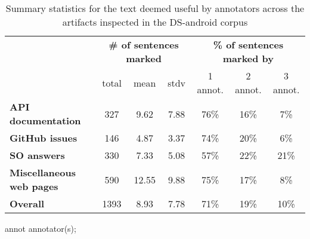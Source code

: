\begin{table}[H]
\centering    
\caption{Summary statistics for the text deemed useful by annotators across the artifacts inspected in the \acs{DS-android} corpus}
\label{tbl:corpus-annotation-summary}
\begin{footnotesize}
\begin{threeparttable}
\begin{tabular}{lcccccc}





& \multicolumn{3}{c}{\textbf{\# of sentences marked}}
& \multicolumn{3}{c}{\textbf{\% of sentences marked by}}
\\ \cmidrule(l){2-4} \cmidrule(l){5-7} 
& total & mean & stdv 
& 1 annot. & 2 annot. & 3 annot. \\

\hline

\textbf{API documentation} 
& 327 & 9.62 & 7.88
& 76\% & 16\% & 7\%
\\
\textbf{GitHub issues} 
& 146 & 4.87 & 3.37
& 74\% & 20\% & 6\%
\\
\textbf{SO answers} 
& 330 & 7.33 & 5.08
& 57\% & 22\% & 21\%
\\
\textbf{Miscellaneous web pages} 
& 590 & 12.55 & 9.88
& 75\% & 17\% & 8\%
\\

\hline
\textbf{Overall} 
& 1393 & 8.93 & 7.78
& 71\% & 19\% & 10\%
\\
\hline

\end{tabular}
\begin{tablenotes}
    \item[annot] annotator(s);
\end{tablenotes}
\end{threeparttable}
\end{footnotesize}
\end{table}

